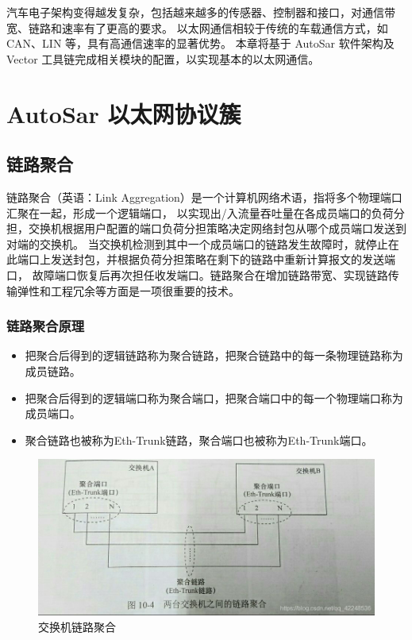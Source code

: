 汽车电子架构变得越发复杂，包括越来越多的传感器、控制器和接口，对通信带宽、链路和速率有了更高的要求。
以太网通信相较于传统的车载通信方式，如 CAN、LIN 等，具有高通信速率的显著优势。
本章将基于 AutoSar 软件架构及 Vector 工具链完成相关模块的配置，以实现基本的以太网通信。

\section{AutoSar 以太网协议簇}

\subsection{链路聚合}
链路聚合\cite{Link_Aggregation}（英语：Link Aggregation）是一个计算机网络术语，指将多个物理端口汇聚在一起，形成一个逻辑端口，
以实现出/入流量吞吐量在各成员端口的负荷分担，交换机根据用户配置的端口负荷分担策略决定网络封包从哪个成员端口发送到对端的交换机。
当交换机检测到其中一个成员端口的链路发生故障时，就停止在此端口上发送封包，并根据负荷分担策略在剩下的链路中重新计算报文的发送端口，
故障端口恢复后再次担任收发端口。链路聚合在增加链路带宽、实现链路传输弹性和工程冗余等方面是一项很重要的技术。

\subsubsection{链路聚合原理}

\begin{itemize}
    \item 把聚合后得到的逻辑链路称为聚合链路，把聚合链路中的每一条物理链路称为成员链路。
    \item 把聚合后得到的逻辑端口称为聚合端口，把聚合端口中的每一个物理端口称为成员端口。
    \item 聚合链路也被称为Eth-Trunk链路，聚合端口也被称为Eth-Trunk端口。
\end{itemize}

\begin{figure}[ht]
    \centering
    \includegraphics[scale=0.5]{pic/20190414170741211.jpg}
    \caption{交换机链路聚合}
    \label{fig:switch_link_aggre}
\end{figure}

